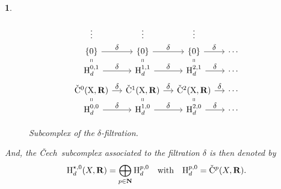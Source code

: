 \documentclass[12pt,reqno]{amsart}
\theoremstyle{article}
\newtheorem{article}{}
\def \H{\mathrm H}
\def \X{\mathrm X}
\newcommand{\NN}{{\bf N}}
\newcommand{\RR}{{\bf R}}
\newcommand{\Cech}{\v{C}ech\ }
\newcommand{\vC}{\check{\mathrm{C}}}
\def \H{\mathrm H}
\begin{document}
\begin{article}
\begin{figure}[ht]
$$\begin{tikzcd}[column sep=small,every label/.append style = {font = \small}]
        \vdots                                             & \vdots                                            &   \vdots                                           &        \\[-.5cm]
        \{0\} \arrow[r,"\delta"]                           & \{0\}  \arrow[r, "\delta"]                        & \{0\} \arrow[r, "\delta"]                          & \cdots \\[-.5cm]
        \H_d^{0,1} \arrow[u ,equal] \arrow[r,"\delta"] & \H_d^{1,1} \arrow[u,equal] \arrow[r,"\delta"] & \H_d^{2,1} \arrow[u,equal] \arrow[r,"\delta"]  & \cdots \\[-.5cm]
        \vC^0(\X,\RR) \arrow[r,"\delta"]                   & \vC^1(\X,\RR)  \arrow[r, "\delta"]                & \vC^2(\X,\RR) \arrow[r, "\delta"]                  & \cdots \\[-.5cm]
        \H_d^{0,0} \arrow[u ,equal] \arrow[r,"\delta"] & \H_d^{1,0} \arrow[u,equal] \arrow[r,"\delta"] & \H_d^{2,0} \arrow[u,equal] \arrow[r,"\delta"]  & \cdots
      \end{tikzcd}
      $$
      \vspace{-.5cm}
      \caption{Subcomplex of the $\delta$-filtration.}
      \label{delta-Subcomplex}
    \end{figure}
    And, the \Cech subcomplex associated to the filtration $\delta$ is then denoted by
    $$
    \H^{\star,0}_d(X,\RR)= \bigoplus_{p\in\NN}\H^{p,0}_d
    \quad \text{with}\quad \H^{p,0}_d  = \vC^p(X,\RR).
    $$
  \end{article}
  
\end{document}
